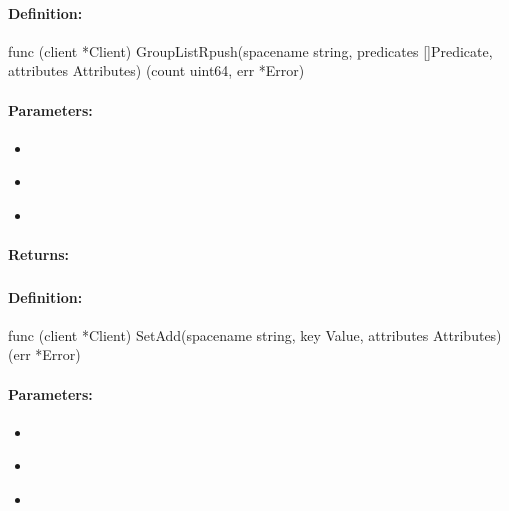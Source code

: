 \paragraph{Definition:}
\begin{gocode}
func (client *Client) GroupListRpush(spacename string, predicates []Predicate, attributes Attributes) (count uint64, err *Error)
\end{gocode}

\paragraph{Parameters:}
\begin{itemize}[noitemsep]
\item {}\\

\item {}\\

\item {}\\

\end{itemize}

\paragraph{Returns:}


\pagebreak
\subsubsection{}
\label{api:Go:SetAdd}


\paragraph{Definition:}
\begin{gocode}
func (client *Client) SetAdd(spacename string, key Value, attributes Attributes) (err *Error)
\end{gocode}

\paragraph{Parameters:}
\begin{itemize}[noitemsep]
\item {}\\

\item {}\\

\item {}\\

\end{itemize}

